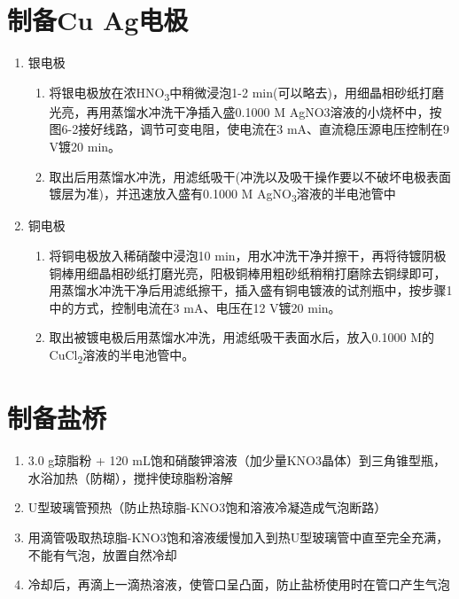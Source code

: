 \documentclass[11pt]{report}
\begin{document}
\section{制备Cu Ag电极}
\label{sec:orgd4c8186}
\begin{enumerate}
\item 银电极
\label{sec:org9f43278}
\begin{enumerate}
\item 将银电极放在浓HNO\textsubscript{3}中稍微浸泡1-2 min(可以略去)，用细晶相砂纸打磨光亮，再用蒸馏水冲洗干净插入盛0.1000 M AgNO3溶液的小烧杯中，按图6-2接好线路，调节可变电阻，使电流在3 mA、直流稳压源电压控制在9 V镀20 min。
\item 取出后用蒸馏水冲洗，用滤纸吸干(冲洗以及吸干操作要以不破坏电极表面镀层为准)，并迅速放入盛有0.1000 M AgNO\textsubscript{3}溶液的半电池管中
\end{enumerate}

\item 铜电极
\label{sec:org3f7e3dd}
\begin{enumerate}
\item 将铜电极放入稀硝酸中浸泡10 min，用水冲洗干净并擦干，再将待镀阴极铜棒用细晶相砂纸打磨光亮，阳极铜棒用粗砂纸稍稍打磨除去铜绿即可，用蒸馏水冲洗干净后用滤纸擦干，插入盛有铜电镀液的试剂瓶中，按步骤1中的方式，控制电流在3 mA、电压在12 V镀20 min。
\item 取出被镀电极后用蒸馏水冲洗，用滤纸吸干表面水后，放入0.1000 M的CuCl\textsubscript{2}溶液的半电池管中。
\end{enumerate}
\end{enumerate}

\section{制备盐桥}
\label{sec:org5f5a91c}
\begin{enumerate}
\item 3.0 g琼脂粉 + 120 mL饱和硝酸钾溶液（加少量KNO3晶体）到三角锥型瓶，水浴加热（防糊），搅拌使琼脂粉溶解
\item U型玻璃管预热（防止热琼脂-KNO3饱和溶液冷凝造成气泡断路）
\item 用滴管吸取热琼脂-KNO3饱和溶液缓慢加入到热U型玻璃管中直至完全充满，不能有气泡，放置自然冷却
\item 冷却后，再滴上一滴热溶液，使管口呈凸面，防止盐桥使用时在管口产生气泡
\end{enumerate}
\end{document}
